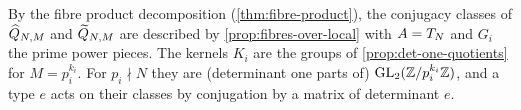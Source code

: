 \begin{example}
\label{ex:conjugacy-quotients}
By the fibre product decomposition (\cref{thm:fibre-product}), the
conjugacy classes of $\widehat{Q}_{N,M}$ and
$\widetilde{Q}_{N,M}$ are described by \cref{prop:fibres-over-local}
with $A = T_{N}$ and $G_i$ the prime power pieces. The kernels
$K_i$ are the groups of \cref{prop:det-one-quotients} for $M = p_i^{k_i}$.
For $p_i \nmid N$ they are (determinant one parts of)
$\GL{2}{\ResidueRing{p_i^{k_i}}}$, and a type $e$ acts on their classes by
conjugation by a matrix of determinant $e$.
\end{example}
